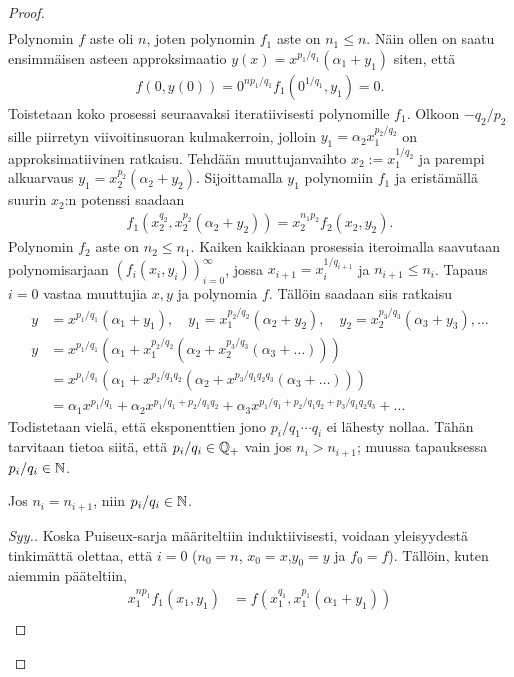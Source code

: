 \begin{proof}
\begin{align*}
    \end{align*}
    Polynomin $f$ aste oli $n$, joten polynomin $f_1$ aste on $n_1\leq n$. Näin ollen on saatu ensimmäisen asteen approksimaatio $y(x)=x^{p_1/q_1}(\alpha_1+y_1)$ siten, että
    \begin{align*}
        f(0,y(0))=0^{np_1/q_1}f_1(0^{1/q_1},y_1)=0.
    \end{align*}
    Toistetaan koko prosessi seuraavaksi iteratiivisesti polynomille $f_1$. Olkoon $-q_2/p_2$ sille piirretyn viivoitinsuoran kulmakerroin, jolloin $y_1=\alpha_2 x_1^{p_2/q_2}$ on approksimatiivinen ratkaisu. Tehdään muuttujanvaihto $x_2:=x_1^{1/q_2}$ ja parempi alkuarvaus $y_1=x_2^{p_2}(\alpha_2+y_2)$. Sijoittamalla $y_1$ polynomiin $f_1$ ja eristämällä suurin $x_2$:n potenssi saadaan
    \begin{align*}
        f_1(x_2^{q_2},x_2^{p_2}(\alpha_2+y_2))=x_2^{n_1 p_2}f_2(x_2,y_2).
    \end{align*}
    Polynomin $f_2$ aste on $n_2\leq n_1$. Kaiken kaikkiaan prosessia iteroimalla saavutaan polynomisarjaan $(f_i(x_i,y_i))_{i=0}^\infty$, jossa $x_{i+1}=x_i^{1/q_{i+1}}$ ja $n_{i+1}\leq n_i$. Tapaus $i=0$ vastaa muuttujia $x,y$ ja polynomia $f$. Tällöin saadaan siis ratkaisu
    \begin{align*}
        y&=x^{p_1/q_1}(\alpha_1+y_1),\quad y_1=x_1^{p_2/q_2}(\alpha_2+y_2),\quad y_2=x_2^{p_3/q_3}(\alpha_3+y_3),\dots \\
        y&=x^{p_1/q_1}(\alpha_1+x_1^{p_2/q_2}(\alpha_2+x_2^{p_3/q_3}(\alpha_3+\dots))) \\
        &=x^{p_1/q_1}(\alpha_1+x^{p_2/q_1q_2}(\alpha_2+x^{p_3/q_1q_2q_3}(\alpha_3+\dots))) \\
        &=\alpha_1x^{p_1/q_1}+\alpha_2x^{p_1/q_1+p_2/q_1q_2}+\alpha_3x^{p_1/q_1+p_2/q_1q_2+p_3/q_1q_2q_3}+\dots
    \end{align*}
    Todistetaan vielä, että eksponenttien jono $p_i/q_1\cdots q_i$ ei lähesty nollaa. Tähän tarvitaan tietoa siitä, että $p_i/q_i\in\mathbb{Q}_+$ vain jos $n_i>n_{i+1}$; muussa tapauksessa $p_i/q_i\in\mathbb{N}$.
    \begin{vaite}
        Jos $n_i=n_{i+1}$, niin $p_i/q_i\in\mathbb{N}$.
    \end{vaite}
    \begin{proof}[Syy.]
        Koska Puiseux-sarja määriteltiin induktiivisesti, voidaan yleisyydestä tinkimättä olettaa, että $i=0$ ($n_0=n$, $x_0=x$,$y_0=y$ ja $f_0=f$). Tällöin, kuten aiemmin pääteltiin,
        \begin{align*}
            x_1^{n p_1}f_1(x_1,y_1)&=f(x_1^{q_1},x_1^{p_1}(\alpha_1+y_1)) \\

\end{align*}
\end{proof}
\end{proof}
